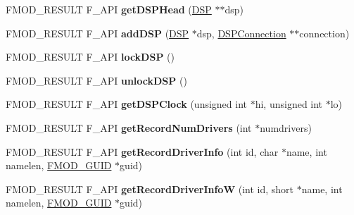 \begin{DoxyCompactItemize}
\item 
F\+M\+O\+D\+\_\+\+R\+E\+S\+U\+LT F\+\_\+\+A\+PI {\bfseries get\+D\+S\+P\+Head} (\hyperlink{class_f_m_o_d_1_1_d_s_p}{D\+SP} $\ast$$\ast$dsp)\hypertarget{class_f_m_o_d_1_1_system_a9cf8e7677c30b2311e8be63f226ff725}{}\label{class_f_m_o_d_1_1_system_a9cf8e7677c30b2311e8be63f226ff725}

\item 
F\+M\+O\+D\+\_\+\+R\+E\+S\+U\+LT F\+\_\+\+A\+PI {\bfseries add\+D\+SP} (\hyperlink{class_f_m_o_d_1_1_d_s_p}{D\+SP} $\ast$dsp, \hyperlink{class_f_m_o_d_1_1_d_s_p_connection}{D\+S\+P\+Connection} $\ast$$\ast$connection)\hypertarget{class_f_m_o_d_1_1_system_a906201eed9cae8c352b4f57393587a16}{}\label{class_f_m_o_d_1_1_system_a906201eed9cae8c352b4f57393587a16}

\item 
F\+M\+O\+D\+\_\+\+R\+E\+S\+U\+LT F\+\_\+\+A\+PI {\bfseries lock\+D\+SP} ()\hypertarget{class_f_m_o_d_1_1_system_a3e214796058609cdf622c8be675f43a9}{}\label{class_f_m_o_d_1_1_system_a3e214796058609cdf622c8be675f43a9}

\item 
F\+M\+O\+D\+\_\+\+R\+E\+S\+U\+LT F\+\_\+\+A\+PI {\bfseries unlock\+D\+SP} ()\hypertarget{class_f_m_o_d_1_1_system_a2caf736a103467e81ff40a34e9702423}{}\label{class_f_m_o_d_1_1_system_a2caf736a103467e81ff40a34e9702423}

\item 
F\+M\+O\+D\+\_\+\+R\+E\+S\+U\+LT F\+\_\+\+A\+PI {\bfseries get\+D\+S\+P\+Clock} (unsigned int $\ast$hi, unsigned int $\ast$lo)\hypertarget{class_f_m_o_d_1_1_system_a459ae3b77f9da1ca9f1cb680b843b074}{}\label{class_f_m_o_d_1_1_system_a459ae3b77f9da1ca9f1cb680b843b074}

\item 
F\+M\+O\+D\+\_\+\+R\+E\+S\+U\+LT F\+\_\+\+A\+PI {\bfseries get\+Record\+Num\+Drivers} (int $\ast$numdrivers)\hypertarget{class_f_m_o_d_1_1_system_a0729c552a7f61ddb37a81feb1469c9e8}{}\label{class_f_m_o_d_1_1_system_a0729c552a7f61ddb37a81feb1469c9e8}

\item 
F\+M\+O\+D\+\_\+\+R\+E\+S\+U\+LT F\+\_\+\+A\+PI {\bfseries get\+Record\+Driver\+Info} (int id, char $\ast$name, int namelen, \hyperlink{struct_f_m_o_d___g_u_i_d}{F\+M\+O\+D\+\_\+\+G\+U\+ID} $\ast$guid)\hypertarget{class_f_m_o_d_1_1_system_a7c9feb1180cbafcd4b7295a72b3e56ff}{}\label{class_f_m_o_d_1_1_system_a7c9feb1180cbafcd4b7295a72b3e56ff}

\item 
F\+M\+O\+D\+\_\+\+R\+E\+S\+U\+LT F\+\_\+\+A\+PI {\bfseries get\+Record\+Driver\+InfoW} (int id, short $\ast$name, int namelen, \hyperlink{struct_f_m_o_d___g_u_i_d}{F\+M\+O\+D\+\_\+\+G\+U\+ID} $\ast$guid)\hypertarget{class_f_m_o_d_1_1_system_a03e2c57a0b01c190e98f92753c606f4a}{}\label{class_f_m_o_d_1_1_system_a03e2c57a0b01c190e98f92753c606f4a}


\end{DoxyCompactItemize}

